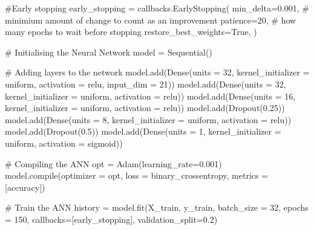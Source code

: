 \documentclass[
  letterpaper,
  DIV=11,
  numbers=noendperiod]{scrartcl}
\newenvironment{Shaded}{\begin{snugshade}}{\end{snugshade}}
\newcommand{\BuiltInTok}[1]{\textcolor[rgb]{0.00,0.23,0.31}{#1}}
\newcommand{\CommentTok}[1]{\textcolor[rgb]{0.37,0.37,0.37}{#1}}
\newcommand{\DecValTok}[1]{\textcolor[rgb]{0.68,0.00,0.00}{#1}}
\newcommand{\FloatTok}[1]{\textcolor[rgb]{0.68,0.00,0.00}{#1}}
\newcommand{\NormalTok}[1]{\textcolor[rgb]{0.00,0.23,0.31}{#1}}
\newcommand{\OperatorTok}[1]{\textcolor[rgb]{0.37,0.37,0.37}{#1}}
\newcommand{\StringTok}[1]{\textcolor[rgb]{0.13,0.47,0.30}{#1}}
\newcommand{\VariableTok}[1]{\textcolor[rgb]{0.07,0.07,0.07}{#1}}
\begin{document}
\begin{Shaded}
\begin{Highlighting}[]
\CommentTok{\#Early stopping}
\NormalTok{early\_stopping }\OperatorTok{=}\NormalTok{ callbacks.EarlyStopping(}
\NormalTok{    min\_delta}\OperatorTok{=}\FloatTok{0.001}\NormalTok{, }\CommentTok{\# minimium amount of change to count as an improvement}
\NormalTok{    patience}\OperatorTok{=}\DecValTok{20}\NormalTok{, }\CommentTok{\# how many epochs to wait before stopping}
\NormalTok{    restore\_best\_weights}\OperatorTok{=}\VariableTok{True}\NormalTok{,}
\NormalTok{)}

\CommentTok{\# Initialising the Neural Network}
\NormalTok{model }\OperatorTok{=}\NormalTok{ Sequential()}

\CommentTok{\# Adding layers to the network}
\NormalTok{model.add(Dense(units }\OperatorTok{=} \DecValTok{32}\NormalTok{, kernel\_initializer }\OperatorTok{=} \StringTok{\textquotesingle{}uniform\textquotesingle{}}\NormalTok{, activation }\OperatorTok{=} \StringTok{\textquotesingle{}relu\textquotesingle{}}\NormalTok{, input\_dim }\OperatorTok{=} \DecValTok{21}\NormalTok{))}
\NormalTok{model.add(Dense(units }\OperatorTok{=} \DecValTok{32}\NormalTok{, kernel\_initializer }\OperatorTok{=} \StringTok{\textquotesingle{}uniform\textquotesingle{}}\NormalTok{, activation }\OperatorTok{=} \StringTok{\textquotesingle{}relu\textquotesingle{}}\NormalTok{))}
\NormalTok{model.add(Dense(units }\OperatorTok{=} \DecValTok{16}\NormalTok{, kernel\_initializer }\OperatorTok{=} \StringTok{\textquotesingle{}uniform\textquotesingle{}}\NormalTok{, activation }\OperatorTok{=} \StringTok{\textquotesingle{}relu\textquotesingle{}}\NormalTok{))}
\NormalTok{model.add(Dropout(}\FloatTok{0.25}\NormalTok{))}
\NormalTok{model.add(Dense(units }\OperatorTok{=} \DecValTok{8}\NormalTok{, kernel\_initializer }\OperatorTok{=} \StringTok{\textquotesingle{}uniform\textquotesingle{}}\NormalTok{, activation }\OperatorTok{=} \StringTok{\textquotesingle{}relu\textquotesingle{}}\NormalTok{))}
\NormalTok{model.add(Dropout(}\FloatTok{0.5}\NormalTok{))}
\NormalTok{model.add(Dense(units }\OperatorTok{=} \DecValTok{1}\NormalTok{, kernel\_initializer }\OperatorTok{=} \StringTok{\textquotesingle{}uniform\textquotesingle{}}\NormalTok{, activation }\OperatorTok{=} \StringTok{\textquotesingle{}sigmoid\textquotesingle{}}\NormalTok{))}

\CommentTok{\# Compiling the ANN}
\NormalTok{opt }\OperatorTok{=}\NormalTok{ Adam(learning\_rate}\OperatorTok{=}\FloatTok{0.001}\NormalTok{)}
\NormalTok{model.}\BuiltInTok{compile}\NormalTok{(optimizer }\OperatorTok{=}\NormalTok{ opt, loss }\OperatorTok{=} \StringTok{\textquotesingle{}binary\_crossentropy\textquotesingle{}}\NormalTok{, metrics }\OperatorTok{=}\NormalTok{ [}\StringTok{\textquotesingle{}accuracy\textquotesingle{}}\NormalTok{])}

\CommentTok{\# Train the ANN}
\NormalTok{history }\OperatorTok{=}\NormalTok{ model.fit(X\_train, y\_train, batch\_size }\OperatorTok{=} \DecValTok{32}\NormalTok{, epochs }\OperatorTok{=} \DecValTok{150}\NormalTok{, callbacks}\OperatorTok{=}\NormalTok{[early\_stopping], validation\_split}\OperatorTok{=}\FloatTok{0.2}\NormalTok{)}
\end{Highlighting}
\end{Shaded}
\end{document}
